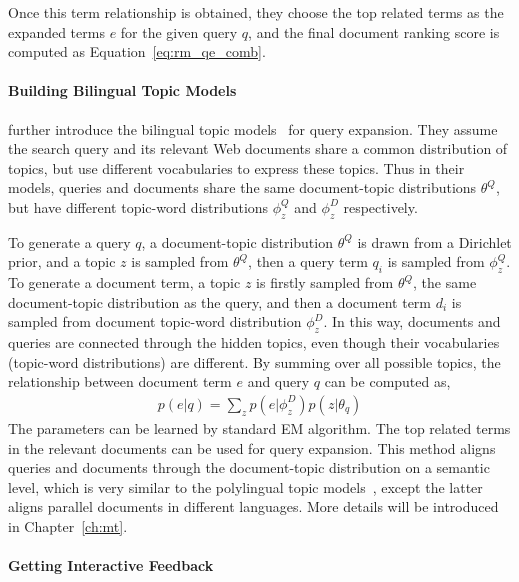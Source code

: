 Once this term relationship is obtained, they choose the top related
terms as the expanded terms $e$ for the given query $q$, and the final
document ranking score is computed as Equation~\ref{eq:rm_qe_comb}.

\paragraph{Building Bilingual Topic Models}

\cite{Gao-2012} further introduce the bilingual topic
models~\citep{Gao-2011} for query expansion. They assume the search
query and its relevant Web documents share a common distribution of
topics, but use different vocabularies to express these topics. Thus
in their models, queries and documents share the same document-topic
distributions $\theta^Q$, but have different topic-word distributions
$\phi_z^Q$ and $\phi_z^D$ respectively.

To generate a query $q$, a document-topic distribution $\theta^Q$ is
drawn from a Dirichlet prior, and a topic $z$ is sampled from
$\theta^Q$, then a query term $q_i$ is sampled from $\phi_z^Q$. To
generate a document term, a topic $z$ is firstly sampled from
$\theta^Q$, the same document-topic distribution as the query, and
then a document term $d_i$ is sampled from document topic-word
distribution $\phi_z^D$. In this way, documents and queries are
connected through the hidden topics, even though their vocabularies
(topic-word distributions) are different. By summing over all possible
topics, the relationship between document term $e$ and query $q$ can
be computed as,
\begin{align}
p(e|q) = \sum_z p(e|\phi_z^D) p(z | \theta_q)
\end{align}
The parameters can be learned by standard EM algorithm. The top related
terms in the relevant documents can be used for query expansion. This
method aligns queries and documents through the document-topic
distribution on a semantic level, which is very similar to the
polylingual topic models~\citep{mimno-09}, except the latter aligns
parallel documents in different languages. More details will be
introduced in Chapter~\ref{ch:mt}.


\paragraph{Getting Interactive Feedback}

